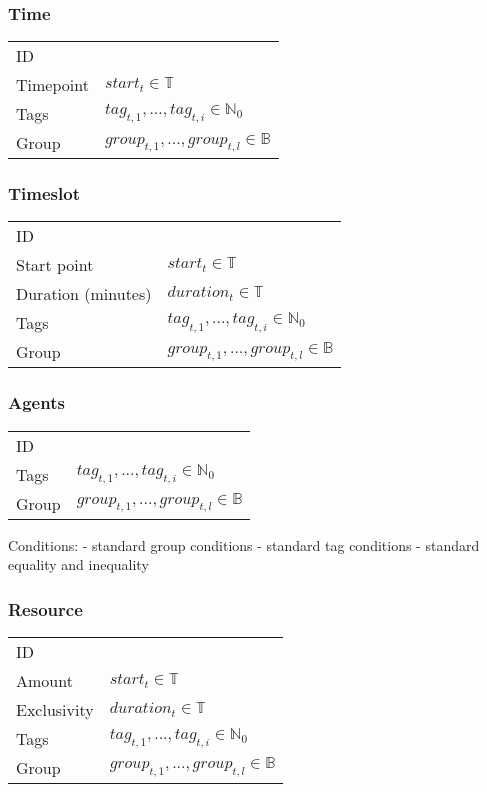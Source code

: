 \subsubsection{Time}
\begin{tabular}{|p{3.5cm}||p{4.75cm}|}
\hline
    ID                	&  \\
    Timepoint           & $start_t\in\mathbb{T}$ \\
    Tags                & $tag_{t,1},...,tag_{t,i}\in\mathbb{N}_0$ \\
    Group				& $group_{t,1},...,group_{t,l}\in\mathbb{B}$ \\
\hline
\end{tabular}


\subsubsection{Timeslot}
\begin{tabular}{|p{3.5cm}||p{4.75cm}|}
\hline
    ID                	&  \\
    Start point         & $start_t\in\mathbb{T}$ \\
    Duration (minutes)  & $duration_t\in\mathbb{T}$ \\
    Tags                & $tag_{t,1},...,tag_{t,i}\in\mathbb{N}_0$ \\
    Group				& $group_{t,1},...,group_{t,l}\in\mathbb{B}$ \\
\hline
\end{tabular}


\subsubsection{Agents}
\begin{tabular}{|p{3.5cm}||p{4.75cm}|}
\hline
    ID                	&  \\
    Tags                & $tag_{t,1},...,tag_{t,i}\in\mathbb{N}_0$ \\
    Group				& $group_{t,1},...,group_{t,l}\in\mathbb{B}$ \\
\hline
\end{tabular}

Conditions:
- standard group conditions
- standard tag conditions
- standard equality and inequality


\subsubsection{Resource}
\begin{tabular}{|p{3.5cm}||p{4.75cm}|}
\hline
    ID                	&  \\
    Amount		        & $start_t\in\mathbb{T}$ \\
    Exclusivity			& $duration_t\in\mathbb{T}$ \\
    Tags                & $tag_{t,1},...,tag_{t,i}\in\mathbb{N}_0$ \\
    Group				& $group_{t,1},...,group_{t,l}\in\mathbb{B}$ \\
\hline
\end{tabular}


